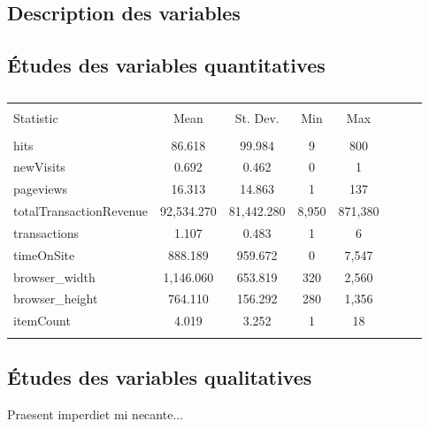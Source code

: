 \subsection{Description des variables}

\subsection{Études des variables quantitatives}

\begin{table}[!htbp] \centering 
  \caption{} 
  \label{} 
\begin{tabular}{@{\extracolsep{5pt}}lccccccc} 
\\[-1.8ex]\hline 
\hline \\[-1.8ex] 
Statistic & \multicolumn{1}{c}{Mean} & \multicolumn{1}{c}{St. Dev.} & \multicolumn{1}{c}{Min} & \multicolumn{1}{c}{Max} \\ 
\hline \\[-1.8ex] 
hits & 86.618 & 99.984 & 9 & 800 \\ 
newVisits & 0.692 & 0.462 & 0  & 1 \\ 
pageviews & 16.313 & 14.863 & 1  & 137 \\ 
totalTransactionRevenue & 92,534.270 & 81,442.280 & 8,950  & 871,380 \\ 
transactions & 1.107 & 0.483 & 1 & 6 \\ 
timeOnSite & 888.189 & 959.672 & 0  & 7,547 \\ 
browser\_width & 1,146.060 & 653.819 & 320 & 2,560 \\ 
browser\_height & 764.110 & 156.292 & 280  & 1,356 \\ 
itemCount & 4.019 & 3.252 & 1  & 18 \\ 
\hline \\[-1.8ex] 
\end{tabular} 
\end{table} 


\subsection{Études des variables qualitatives}



Praesent imperdiet mi necante...